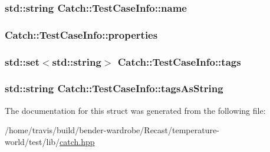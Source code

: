 \hypertarget{struct_catch_1_1_test_case_info_a463794e2f5cfead307c93efd134ade36}{
\subsubsection[{name}]{\setlength{\rightskip}{0pt plus 5cm}std\-::string Catch\-::\-Test\-Case\-Info\-::name}}\label{struct_catch_1_1_test_case_info_a463794e2f5cfead307c93efd134ade36}
\hypertarget{struct_catch_1_1_test_case_info_afc1e84bd7a2e180895a06d9131302af0}{
\subsubsection[{properties}]{ Catch\-::\-Test\-Case\-Info\-::properties}}\label{struct_catch_1_1_test_case_info_afc1e84bd7a2e180895a06d9131302af0}
\hypertarget{struct_catch_1_1_test_case_info_a045f62e7719a8760a5b456f7fd2dc97c}{
\subsubsection[{tags}]{\setlength{\rightskip}{0pt plus 5cm}std\-::set$<$std\-::string$>$ Catch\-::\-Test\-Case\-Info\-::tags}}\label{struct_catch_1_1_test_case_info_a045f62e7719a8760a5b456f7fd2dc97c}
\hypertarget{struct_catch_1_1_test_case_info_ac65c2d36fd36f71e9bf782b2ea245c64}{
\subsubsection[{tags\-As\-String}]{\setlength{\rightskip}{0pt plus 5cm}std\-::string Catch\-::\-Test\-Case\-Info\-::tags\-As\-String}}\label{struct_catch_1_1_test_case_info_ac65c2d36fd36f71e9bf782b2ea245c64}


The documentation for this struct was generated from the following file\-:\begin{DoxyCompactItemize}
\item 
/home/travis/build/bender-\/wardrobe/\-Recast/temperature-\/world/test/lib/\hyperlink{catch_8hpp}{catch.\-hpp}\end{DoxyCompactItemize}
